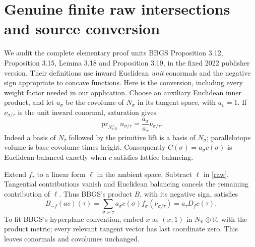 \documentclass[11pt]{article}
\newcommand{\R}{\mathbb R}
\begin{document}
\section{Genuine finite raw intersections and source conversion}
We audit the complete elementary proof units BBGS Proposition 3.12,
Proposition 3.15, Lemma 3.18 and Proposition 3.19, in the fixed 2022
publisher version. Their definitions use inward Euclidean \emph{unit}
conormals and the negative sign appropriate to concave functions. Here is
the conversion, including every weight factor needed in our application.
Choose an auxiliary Euclidean inner product, and let \(a_\sigma\) be
the covolume of \(N_\sigma\) in its tangent space, with \(a_v=1\).
If \(\nu_{\sigma/\tau}\) is the unit inward conormal, saturation gives
\begin{equation}\label{height}
 \operatorname{pr}_{N_{\tau,\R}^{\perp}}n_{\sigma/\tau}
   =\frac{a_\sigma}{a_\tau}\nu_{\sigma/\tau}.
\end{equation}
Indeed a basis of \(N_\tau\) followed by the primitive lift is a basis of
\(N_\sigma\); parallelotope volume is base covolume times height.
Consequently \(C(\sigma)=a_\sigma c(\sigma)\) is Euclidean balanced exactly
when \(c\) satisfies lattice balancing.

Extend \(f_\tau\) to a linear form \(\ell\) in the ambient space. Subtract
\(\ell\) in \eqref{raw}. Tangential contributions vanish and Euclidean
balancing cancels the remaining contribution of \(\ell\). Thus BBGS's
product \(B\), with its negative sign, satisfies
\begin{equation}\label{convert}
 B_{-f}(ac)(\tau)
 =\sum_{\sigma\succ\tau}a_\sigma c(\sigma)f_\sigma(\nu_{\sigma/\tau})
 =a_\tau D_f c(\tau).
\end{equation}
To fit BBGS's hyperplane convention, embed \(x\) as \((x,1)\) in
\(N_\R\oplus\R\), with the product metric; every relevant tangent vector
has last coordinate zero. This leaves conormals and covolumes unchanged.
\end{document}
